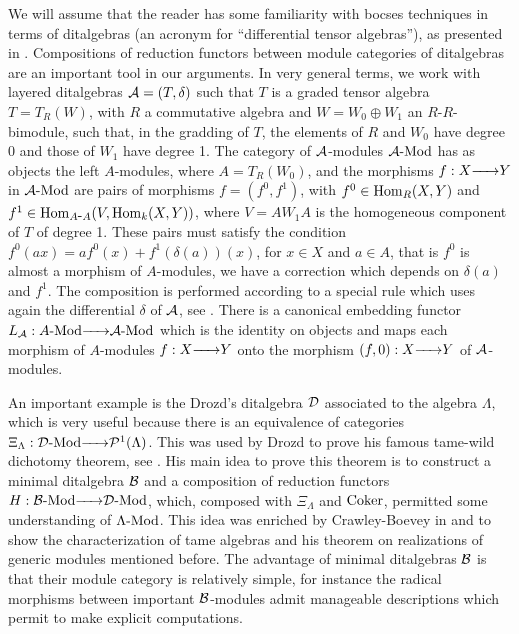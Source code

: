 \documentclass{article}
\theoremstyle{definition}
\newcommand{\Coker}{{ \rm Coker }}
\newcommand{\Hom}{{ \rm Hom }}
\newcommand{\Mod}{{ \rm Mod }}
\newcommand{\g}{\hbox{-}}
\newcommand{\rightmap}[1]{\smash{\mathop{\hbox to 
20pt{\rightarrowfill}}\limits^{#1}}}
\begin{document}
We will assume that the reader has some familiarity with bocses techniques in terms of ditalgebras (an acronym for ``differential tensor algebras''), as presented in \cite{BSZ}. Compositions of reduction functors between module categories of ditalgebras are an important tool in our arguments. In very general terms, we work with  layered ditalgebras ${\cal A}=(T,\delta)$ such that  $T$ is a graded tensor algebra $T=T_R(W)$, with $R$ a commutative algebra and $W=W_0\oplus W_1$  an $R$-$R$-bimodule, such that, in the gradding of $T$, the elements of   $R$ and $W_0$ have degree 0 and those of  $W_1$ have degree 1. The category of ${\cal A}$-modules ${\cal A}\g\Mod$ has as objects the left $A$-modules, where $A=T_R(W_0)$, and the morphisms $f:X\rightmap{}Y$ in  ${\cal A}\g\Mod$ are pairs of morphisms $f=(f^0,f^1)$, with $f^0\in \Hom_R(X,Y)$ and $ f^1\in \Hom_{A\g A}(V,\Hom_k(X,Y))$, where $V=AW_1A$ is the homogeneous component of $T$ of degree 1. 
These pairs must satisfy the condition $f^0(ax)=af^0(x)+f^1(\delta(a))(x)$, for $x\in X$ and $a\in A$, that is 
$f^0$ is almost a morphism of $A$-modules, we have a correction which depends on $\delta(a)$ and $f^1$.  The composition is performed according to a special rule which uses again the differential $\delta$ of ${\cal A}$, see \cite[\S2]{BSZ}. There is a canonical embedding functor $L_{\cal A}: A\g\Mod\rightmap{}{\cal A}\g\Mod$ which is the identity on objects and maps each morphism of $A$-modules $f:X\rightmap{}Y$ onto the morphism $(f,0):X\rightmap{}Y$ of ${\cal A}$-modules. 

  An important example is the Drozd's ditalgebra ${\cal D}$ associated to the algebra $\Lambda$, which is very useful because  there is an equivalence of categories $\Xi_\Lambda:{\cal D}\g\Mod\rightmap{}{\cal P}^1(\Lambda)$. This   was used by Drozd to prove his famous tame-wild dichotomy theorem, see \cite{D}. His main idea to prove this theorem is to construct a minimal ditalgebra ${\cal B}$ and a composition of reduction functors   
  $H:{\cal B}\g\Mod\rightmap{}{\cal D}\g\Mod$, 
which, composed with $\Xi_\Lambda$ and $\Coker$, permitted some understanding of $\Lambda\g\Mod$. This idea was enriched by Crawley-Boevey in \cite{CB1} and \cite{CB2} to show the characterization of tame algebras and his theorem on realizations of generic modules  mentioned before.  The advantage of minimal ditalgebras ${\cal B}$ is that their module category is relatively simple, for instance the radical morphisms between important ${\cal B}$-modules admit  manageable   descriptions which permit to make explicit computations.
 
\end{document}
